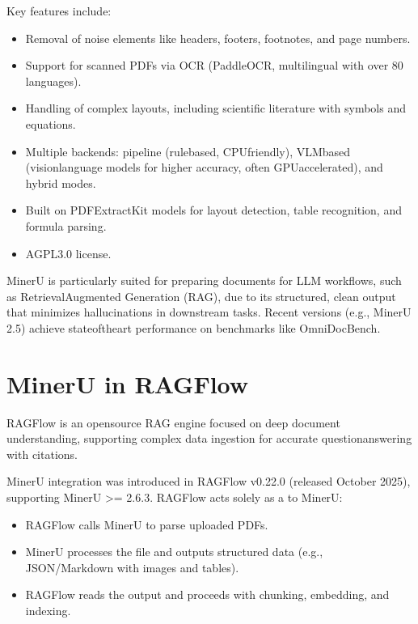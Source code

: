 \documentclass[letterpaper,10pt,english]{sphinxmanual}
\begin{document}
\sphinxAtStartPar
Key features include:
\begin{itemize}
\item {} 
\sphinxAtStartPar
Removal of noise elements like headers, footers, footnotes, and page
numbers.

\item {} 
\sphinxAtStartPar
Support for scanned PDFs via OCR (PaddleOCR, multilingual with over
80 languages).

\item {} 
\sphinxAtStartPar
Handling of complex layouts, including scientific literature with
symbols and equations.

\item {} 
\sphinxAtStartPar
Multiple backends: pipeline (rule\sphinxhyphen{}based, CPU\sphinxhyphen{}friendly), VLM\sphinxhyphen{}based
(vision\sphinxhyphen{}language models for higher accuracy, often GPU\sphinxhyphen{}accelerated),
and hybrid modes.

\item {} 
\sphinxAtStartPar
Built on PDF\sphinxhyphen{}Extract\sphinxhyphen{}Kit models for layout detection, table
recognition, and formula parsing.

\item {} 
\sphinxAtStartPar
AGPL\sphinxhyphen{}3.0 license.

\end{itemize}

\sphinxAtStartPar
MinerU is particularly suited for preparing documents for LLM workflows,
such as Retrieval\sphinxhyphen{}Augmented Generation (RAG), due to its structured,
clean output that minimizes hallucinations in downstream tasks. Recent
versions (e.g., MinerU 2.5) achieve state\sphinxhyphen{}of\sphinxhyphen{}the\sphinxhyphen{}art performance on
benchmarks like OmniDocBench.


\section{MinerU in RAGFlow}
\label{\detokenize{minerU:mineru-in-ragflow}}
\sphinxAtStartPar
RAGFlow is an open\sphinxhyphen{}source RAG engine focused on deep document
understanding, supporting complex data ingestion for accurate
question\sphinxhyphen{}answering with citations.

\sphinxAtStartPar
MinerU integration was introduced in RAGFlow v0.22.0 (released October
2025), supporting MinerU \textgreater{}= 2.6.3. RAGFlow acts solely as a 
to MinerU:
\begin{itemize}
\item {} 
\sphinxAtStartPar
RAGFlow calls MinerU to parse uploaded PDFs.

\item {} 
\sphinxAtStartPar
MinerU processes the file and outputs structured data (e.g.,
JSON/Markdown with images and tables).

\item {} 
\sphinxAtStartPar
RAGFlow reads the output and proceeds with chunking, embedding, and
indexing.

\end{itemize}
\end{document}
